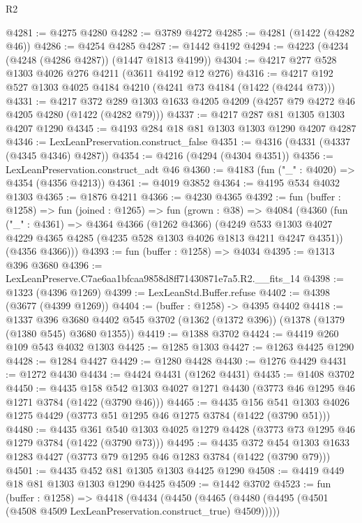 \begin{lexlean}{R2}
\begin{coremodule}
@4281 := @4275 @4280
@4282 := @3789 @4272
@4285 := @4281 (@1422 (@4282 @46))
@4286 := @4254 @4285
@4287 := @1442 @4192
@4294 := @4223 (@4234 (@4248 (@4286 @4287)) (@1447 @1813 @4199))
@4304 := @4217 @277 @528 @1303 @4026 @276 @4211 (@3611 @4192 @12 @276)
@4316 := @4217 @192 @527 @1303 @4025 @4184 @4210 (@4241 @73 @4184 (@1422 (@4244 @73)))
@4331 := @4217
    @372
    @289
    @1303
    @1633
    @4205
    @4209
    (@4257 @79 @4272 @46 @4205 @4280 (@1422 (@4282 @79)))
@4337 := @4217 @287 @81 @1305 @1303 @4207 @1290
@4345 := @4193 @284 @18 @81 @1303 @1303 @1290 @4207 @4287
@4346 := LexLeanPreservation.construct_false
@4351 := @4316 (@4331 (@4337 (@4345 @4346) @4287))
@4354 := @4216 (@4294 (@4304 @4351))
@4356 := LexLeanPreservation.construct_adt @46
@4360 := @4183 (fun ("_" : @4020) => @4354 (@4356 @4213))
@4361 := @4019 @3852
@4364 := @4195 @534 @4032 @1303
@4365 := @1876 @4211
@4366 := @4230 @4365
@4392 := fun (buffer : @1258) =>
  fun (joined : @1265) =>
  fun (grown : @38) =>
  @4084
    (@4360
      (fun ("_" : @4361) =>
      @4364
        @4366
        (@1262 @4366)
        (@4249 @533 @1303 @4027 @4229 @4365 @4285 (@4235 @528 @1303 @4026 @1813 @4211 @4247 @4351))
        (@4356 @4366)))
@4393 := fun (buffer : @1258) => @4034
@4395 := @1313 @396 @3680
@4396 := LexLeanPreserve.C7ae6aa1bfcaa9858d8ff71430871e7a5.R2.__fits_14
@4398 := @1323 (@4396 @1269)
@4399 := LexLeanStd.Buffer.refuse
@4402 := @4398 (@3677 (@4399 @1269))
@4404 := (buffer : @1258) -> @4395 @4402
@4418 := @1337
    @396
    @3680
    @4402
    @545
    @3702
    (@1362 (@1372 @396))
    (@1378 (@1379 (@1380 @545) @3680 @1355))
@4419 := @1388 @3702
@4424 := @4419 @260 @109 @543 @4032 @1303
@4425 := @1285 @1303
@4427 := @1263 @4425 @1290
@4428 := @1284 @4427
@4429 := @1280 @4428
@4430 := @1276 @4429
@4431 := @1272 @4430
@4434 := @4424 @4431 (@1262 @4431)
@4435 := @1408 @3702
@4450 := @4435
    @158
    @542
    @1303
    @4027
    @1271
    @4430
    (@3773 @46 @1295 @46 @1271 @3784 (@1422 (@3790 @46)))
@4465 := @4435
    @156
    @541
    @1303
    @4026
    @1275
    @4429
    (@3773 @51 @1295 @46 @1275 @3784 (@1422 (@3790 @51)))
@4480 := @4435
    @361
    @540
    @1303
    @4025
    @1279
    @4428
    (@3773 @73 @1295 @46 @1279 @3784 (@1422 (@3790 @73)))
@4495 := @4435
    @372
    @454
    @1303
    @1633
    @1283
    @4427
    (@3773 @79 @1295 @46 @1283 @3784 (@1422 (@3790 @79)))
@4501 := @4435 @452 @81 @1305 @1303 @4425 @1290
@4508 := @4419 @449 @18 @81 @1303 @1303 @1290 @4425
@4509 := @1442 @3702
@4523 := fun (buffer : @1258) =>
  @4418
    (@4434
      (@4450 (@4465 (@4480 (@4495 (@4501 (@4508 @4509 LexLeanPreservation.construct_true) @4509)))))

\end{coremodule}
\end{lexlean}
